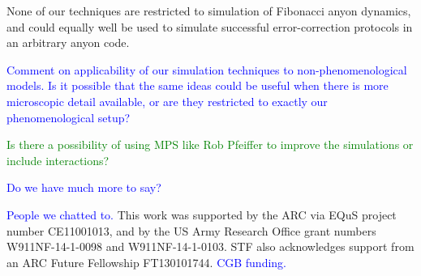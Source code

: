 \documentclass[aps, prl, letterpaper, twocolumn, superscriptaddress, notitlepage, 10pt]{revtex4-1}
\newcommand{\cggb}[1]{\textcolor{blue}{#1}}
\newcommand{\stf}[1]{\textcolor{green}{#1}}
\begin{document}
None of our techniques are restricted to simulation of Fibonacci anyon dynamics, and could 
equally well be used to simulate successful error-correction protocols in an arbitrary anyon 
code.	
	
\cggb{Comment on applicability of our simulation techniques to non-phenomenological 
models. Is it possible that the same ideas could be useful when there is more microscopic 
detail available, or are they restricted to exactly our phenomenological setup?}

\stf{Is there a possibility of using MPS like Rob Pfeiffer to improve the simulations or 
include interactions?}

\cggb{Do we have much more to say?}


\acknowledgements 

\cggb {People we chatted to.} This work was supported by the ARC via 
EQuS project number CE11001013, and by the US Army Research Office grant numbers 
W911NF-14-1-0098 and W911NF-14-1-0103. STF also acknowledges support from an 
ARC Future Fellowship FT130101744. \cggb{CGB funding.}


\end{document}

